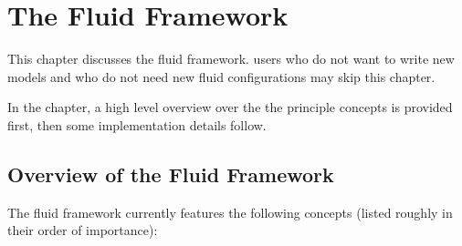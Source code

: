 \chapter{The \eWoms Fluid Framework}
\label{sec:fluidframework}

This chapter discusses the \eWoms fluid framework. \eWoms users who
do not want to write new models and who do not need new fluid
configurations may skip this chapter.

In the chapter, a high level overview over the the principle concepts
is provided first, then some implementation details follow.

\section{Overview of the Fluid Framework}

The \eWoms fluid framework currently features the following concepts
(listed roughly in their order of importance):


